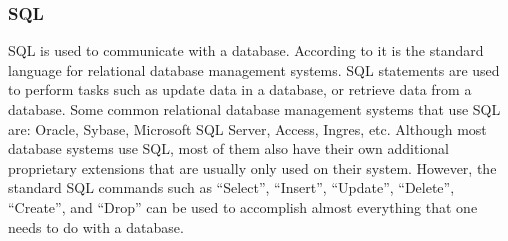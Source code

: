 \subsubsection{SQL}

SQL is used to communicate with a database. According to  it is the standard language for relational database management systems. SQL statements are used to perform tasks such as update data in a database, or retrieve data from a database. Some common relational database management systems that use SQL are: Oracle, Sybase, Microsoft SQL Server, Access, Ingres, etc. Although most database systems use SQL, most of them also have their own additional proprietary extensions that are usually only used on their system. However, the standard SQL commands such as \enquote{Select}, \enquote{Insert}, \enquote{Update}, \enquote{Delete}, \enquote{Create}, and \enquote{Drop} can be used to accomplish almost everything that one needs to do with a database.

